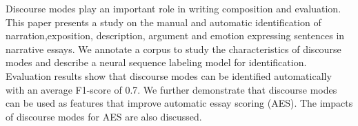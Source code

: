 Discourse modes play an important role in writing composition and evaluation. This paper presents a study on the manual and automatic identification of narration,exposition, description, argument and emotion expressing sentences in narrative essays. We annotate a corpus to study the characteristics of discourse modes and describe a neural sequence labeling model for identification. Evaluation results show that discourse modes can be identified automatically with an average F1-score of 0.7. We further demonstrate that discourse modes can be used as features that improve automatic essay scoring (AES). The impacts of discourse modes for AES are also discussed.
